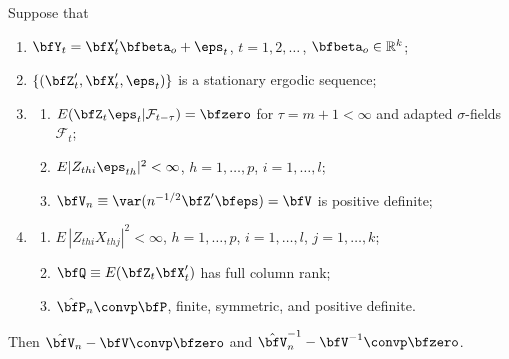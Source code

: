 \begin{theorem}\label{thm:6.9}
Suppose that
\begin{enumerate}[label=(\roman*)]
  \item $\bfY_t = \bfX_t'\bfbeta_o + \eps_t$, \quad $t = 1,2,\ldots$\,, \quad $\bfbeta_o \in \mathbb{R}^k$;
  \item $\{(\bfZ_t',\bfX_t',\eps_t)\}$ is a stationary ergodic sequence;
  \item\begin{enumerate}[label=(\alph*)]
    \item $E(\bfZ_t\eps_t|\mathcal{F}_{t-\tau}) = \bfzero$ for $\tau = m+1 < \infty$ and adapted $\sigma$-fields $\mathcal{F}_t$;
    \item $E|Z_{thi}\eps_{th}|^2 < \infty$, $h = 1,\ldots,p$, $i = 1,\ldots,l$;
    \item $\bfV_n \equiv \var(n^{-1/2}\bfZ'\bfeps) = \bfV$ is positive definite;
  \end{enumerate}
  \item\begin{enumerate}[label=(\alph*)]
    \item $E\,|Z_{thi}X_{thj}|^2 < \infty$, $h = 1,\ldots,p$, $i = 1,\ldots,l$, $j = 1,\ldots,k$;
    \item $\bfQ \equiv E(\bfZ_t\bfX_t')$ has full column rank;
    \item $\hat{\bfP}_n \convp \bfP$, finite, symmetric, and positive definite.
  \end{enumerate}
\end{enumerate}
Then $\hat{\bfV}_n - \bfV \convp \bfzero$ and $\hat{\bfV}_n^{-1} - \bfV^{-1} \convp \bfzero$.
\end{theorem}

